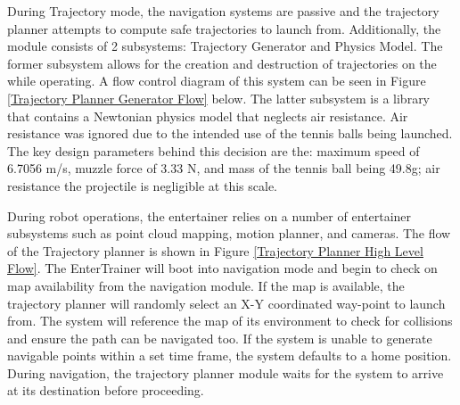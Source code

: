 \documentclass[11pt]{article}
\begin{document}
During Trajectory mode, the navigation systems are passive and the trajectory planner attempts to compute safe trajectories to launch from. Additionally, the module consists of 2 subsystems: Trajectory Generator and Physics Model. The former subsystem allows for the creation and destruction of trajectories on the while operating. A flow control diagram of this system can be seen in Figure \ref{Trajectory Planner Generator Flow} below. The latter subsystem is a library that contains a Newtonian physics model that neglects air resistance. Air resistance was ignored due to the intended use of the tennis balls being launched. The key design parameters behind this decision are the: maximum speed of 6.7056 m/s, muzzle force of 3.33 N, and mass of the tennis ball being 49.8g; air resistance the projectile is negligible at this scale. 

During robot operations, the entertainer relies on a number of entertainer subsystems such as point cloud mapping, motion planner, and cameras. The flow of the Trajectory planner is shown in Figure \ref{Trajectory Planner High Level Flow}. The EnterTrainer will boot into navigation mode and begin to check on map availability from the navigation module. If the map is available, the trajectory planner will randomly select an X-Y coordinated way-point to launch from. The system will reference the map of its environment to check for collisions and ensure the path can be navigated too. If the system is unable to generate navigable points within a set time frame, the system defaults to a home position. During navigation, the trajectory planner module waits for the system to arrive at its destination before proceeding.
\end{document}
